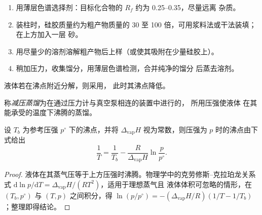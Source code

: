 \begin{method}[快速柱色谱操作]\label{met:b2:lab-techniques-2:flash}
\begin{enumerate}
  \item 用薄层色谱选择剂：目标化合物的 $R_f$ 约为 0.25--0.35，尽量远离
        杂质。
  \item 装柱时，硅胶质量约为粗产物质量的 30 至 100 倍，可用浆料法或干法装填；在上方加入一层
        砂。
  \item 用尽量少的溶剂溶解粗产物后上样（或使其吸附在少量硅胶上）。
  \item 稍加压力，收集馏分，用薄层色谱检测，合并纯净的馏分
        后蒸去溶剂。
\end{enumerate}
\end{method}

液体若在沸点附近分解，则采用，
此时其沸点降低。

\begin{definition}[减压蒸馏]\label{def:b2:lab-techniques-2:reduced-pressure}
称\emph{减压蒸馏}为在通过压力计与真空泵相连的装置中进行的，
所用压强使液体
在其能承受的温度下沸腾的蒸馏。
\end{definition}

\begin{proposition}[减压下的沸腾]\label{prop:b2:lab-techniques-2:reduced-pressure}
设 $T_b$ 为参考压强 $p^\circ$ 下的沸点，并将 $\Delta_{\mathrm{vap}}H$
视为常数，则压强为 $p$ 时的沸点由下式给出
\begin{equation*}
\frac{1}{T} = \frac{1}{T_b} - \frac{R}{\Delta_{\mathrm{vap}}H}\ln\frac{p}{p^\circ}.
\end{equation*}
\end{proposition}

\begin{proof}
液体在其蒸气压等于上方压强时沸腾。物理学中的克劳修斯–克拉珀龙关系式
$\mathrm d\ln p/\mathrm dT = \Delta_{\mathrm{vap}}H/(RT^2)$，适用于理想蒸气且
液体体积可忽略的情形，在 $(T_b, p^\circ)$ 与 $(T, p)$ 之间积分，得 $\ln(p/p^\circ) =
-(\Delta_{\mathrm{vap}}H/R)(1/T - 1/T_b)$；整理即得结论。
\end{proof}

